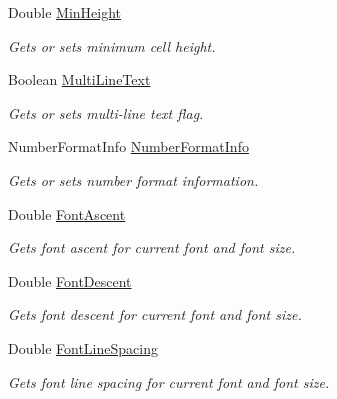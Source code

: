 \begin{DoxyCompactItemize}
Double \hyperlink{class_pdf_file_writer_1_1_pdf_table_style_ae73d9fbcc9a57952bc117fa5621671de}{Min\+Height}
\begin{DoxyCompactList}\small\item\em Gets or sets minimum cell height. \end{DoxyCompactList}\item 
Boolean \hyperlink{class_pdf_file_writer_1_1_pdf_table_style_a887b6da46156233a3d9c62718deab2f1}{Multi\+Line\+Text}
\begin{DoxyCompactList}\small\item\em Gets or sets multi-\/line text flag. \end{DoxyCompactList}\item 
Number\+Format\+Info \hyperlink{class_pdf_file_writer_1_1_pdf_table_style_a2beb6ef95dd078268bb988549e999f8a}{Number\+Format\+Info}
\begin{DoxyCompactList}\small\item\em Gets or sets number format information. \end{DoxyCompactList}\item 
Double \hyperlink{class_pdf_file_writer_1_1_pdf_table_style_a7c02d7a8be316e1a2bf84e84533a14c0}{Font\+Ascent}
\begin{DoxyCompactList}\small\item\em Gets font ascent for current font and font size. \end{DoxyCompactList}\item 
Double \hyperlink{class_pdf_file_writer_1_1_pdf_table_style_a588402d29e5452382432dc8df3622524}{Font\+Descent}
\begin{DoxyCompactList}\small\item\em Gets font descent for current font and font size. \end{DoxyCompactList}\item 
Double \hyperlink{class_pdf_file_writer_1_1_pdf_table_style_a01527bc2956f9464c2f0be882205aa64}{Font\+Line\+Spacing}
\begin{DoxyCompactList}\small\item\em Gets font line spacing for current font and font size. \end{DoxyCompactList}\end{DoxyCompactItemize}


